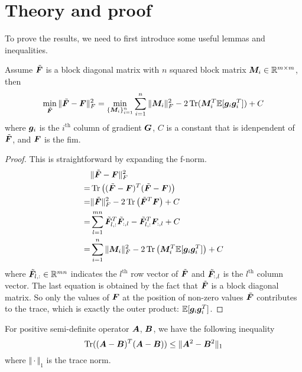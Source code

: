 \section{Theory and proof}
\label{app: theory and proof}
To prove the results, we need to first introduce some useful lemmas and inequalities.

\begin{lemma}
    Assume $\tilde{\bm{F}}$ is a block diagonal matrix with $n$ squared block matrix ${\bm{M}}_i\in\mathbb{R}^{m\times m}$, then 
    \begin{equation}
        \min_{\tilde{\bm{F}}} \Vert\tilde{\bm{F}}-{\bm{F}}\Vert_F^2 = \min_{\{{\bm{M}}_i\}_{i=1}^n} \sum_{i=1}^n \Vert{\bm{M}}_i\Vert_F^2 - 2\operatorname{Tr}({\bm{M}}_i^T\mathbb{E}[{\bm{g}}_i{\bm{g}}_i^T]) + C
    \end{equation}
where ${\bm{g}}_i$ is the $i^{\text{th}}$ column of gradient ${\bm{G}}$, $C$ is a constant that is idenpendent of $\tilde{\bm{F}}$, and ${\bm{F}}$ is the \gls{fim}. 
\label{lemma: block diagonal simplification}
\end{lemma}
\begin{proof}
    This is straightforward by expanding the \gls{f-norm}. 
    \begin{align*}
        &\Vert\tilde{\bm{F}}-{\bm{F}}\Vert_F^2\\
        =& \operatorname{Tr}\left((\tilde{\bm{F}}-{\bm{F}})^T(\tilde{\bm{F}}-{\bm{F}})\right)\\
        =&\Vert\tilde{\bm{F}}\Vert_F^2 - 2\operatorname{Tr}\left(\tilde{\bm{F}}^T{\bm{F}}\right) + C\\
        =& \sum_{l=1}^{mn} \tilde{\bm{F}}_{l,:}^T\tilde{\bm{F}}_{:,l} - \tilde{\bm{F}}_{l,:}^T {\bm{F}}_{:,l} + C\\
        =& \sum_{i=1}^n \Vert{\bm{M}}_i\Vert_F^2-2\operatorname{Tr}\left({\bm{M}}_i^T\mathbb{E}[{\bm{g}}_i{\bm{g}}_i^T]\right) + C
    \end{align*}
where $\tilde{\bm{F}}_{l,:}\in \mathbb{R}^{mn}$ indicates the $l^{\text{th}}$ row vector of $\tilde{\bm{F}}$ and $\tilde{\bm{F}}_{:,l}$ is the $l^{\text{th}}$ column vector. The last equation is obtained by the fact that $\tilde{\bm{F}}$ is a block diagonal matrix. So only the values of ${\bm{F}}$ at the position of non-zero values $\tilde{\bm{F}}$ contributes to the trace, which is exactly the outer product: $\mathbb{E}[{\bm{g}}_i{\bm{g}}_i^T]$. 
\end{proof}

\begin{lemma}
    For positive semi-definite operator ${\bm{A}}$, ${\bm{B}}$, we have the following inequality
    \begin{equation}
        \operatorname{Tr}(({\bm{A}}-{\bm{B}})^T({\bm{A}}-{\bm{B}})) \leq \Vert{\bm{A}}^2 -{\bm{B}}^2\Vert_1
        \label{eq: powers stormer inequality}
    \end{equation}
    \label{lemma: powers stormer inequality}
    where $\Vert\cdot\Vert_1$ is the trace norm.
\end{lemma}





% 
